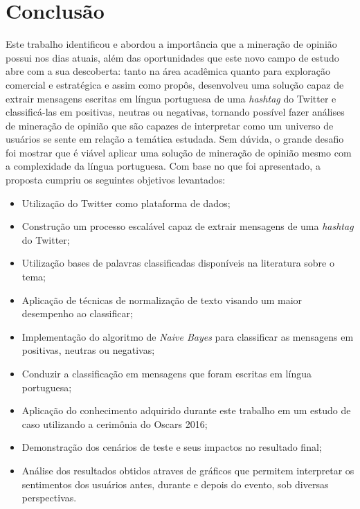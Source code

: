 \chapter{Conclusão} \label{cap:conclusao}

Este trabalho identificou e abordou a importância que a mineração de opinião possui nos dias atuais, além das oportunidades que este novo campo de estudo abre com a sua descoberta: tanto na área acadêmica quanto para exploração comercial e estratégica e assim como propôs, desenvolveu uma solução capaz de extrair mensagens escritas em língua portuguesa de uma \textit{hashtag} do Twitter e classificá-las em positivas, neutras ou negativas, tornando possível fazer análises de mineração de opinião que são capazes de interpretar como um universo de usuários se sente em relação a temática estudada. Sem dúvida, o grande desafio foi mostrar que é viável aplicar uma solução de mineração de opinião mesmo com a complexidade da língua portuguesa.
Com base no que foi apresentado, a proposta cumpriu os seguintes objetivos levantados:

\begin{itemize}
	\item Utilização do Twitter como plataforma de dados;
	\item Construção um processo escalável capaz de extrair mensagens de uma \textit{hashtag} do Twitter;
	\item Utilização bases de palavras classificadas disponíveis na literatura sobre o tema;
	\item Aplicação de técnicas de normalização de texto visando um maior desempenho ao classificar;
	\item Implementação do algoritmo de \textit{Naive Bayes} para classificar as mensagens em positivas, neutras ou negativas;
	\item Conduzir a classificação em mensagens que foram escritas em língua portuguesa;
	\item Aplicação do conhecimento adquirido durante este trabalho em um estudo de caso utilizando a cerimônia do Oscars 2016;
	\item Demonstração dos cenários de teste e seus impactos no resultado final;
	\item Análise dos resultados obtidos atraves de gráficos que permitem interpretar os sentimentos dos usuários antes, durante e depois do evento, sob diversas perspectivas.
\end{itemize}

